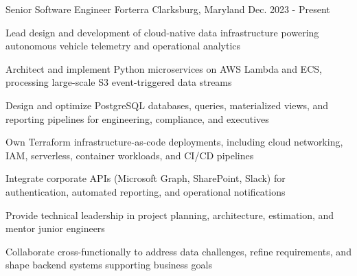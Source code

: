 

\begin{cventries}


\cventry
{Senior Software Engineer} %
{Forterra} %
{Clarksburg, Maryland} %
{Dec. 2023 - Present} %
{
  \begin{cvitems} %
    \item {Lead design and development of cloud-native data infrastructure powering autonomous vehicle telemetry and operational analytics}
    \item {Architect and implement Python microservices on AWS Lambda and ECS, processing large-scale S3 event-triggered data streams}
    \item {Design and optimize PostgreSQL databases, queries, materialized views, and reporting pipelines for engineering, compliance, and executives}
    \item {Own Terraform infrastructure-as-code deployments, including cloud networking, IAM, serverless, container workloads, and CI/CD pipelines}
    \item {Integrate corporate APIs (Microsoft Graph, SharePoint, Slack) for authentication, automated reporting, and operational notifications}
    \item {Provide technical leadership in project planning, architecture, estimation, and mentor junior engineers}
    \item {Collaborate cross-functionally to address data challenges, refine requirements, and shape backend systems supporting business goals}
  \end{cvitems}
}



\end{cventries}
